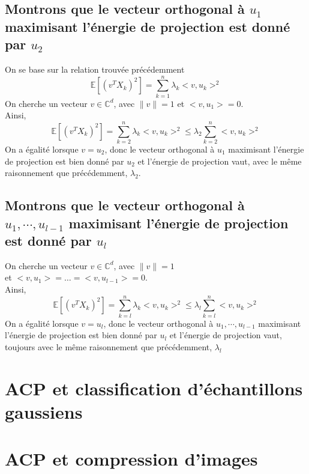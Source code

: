 \documentclass{report}
\begin{document}
		\subsection{Montrons que le vecteur orthogonal à $u_1$ maximisant l'énergie de projection est donné par $u_2$}
			On se base sur la relation trouvée précédemment
			\[ \mathbb{E}[(v^TX_k)^2] = \sum\limits_{k=1}^n \lambda_k<v, u_k>^2 \]
			On cherche un vecteur $v \in \mathbb{C}^d$, avec $\lVert v \rVert = 1$ et $<v, u_1> = 0$. \\
			Ainsi, 
			\[ \mathbb{E}[(v^TX_k)^2] = \sum\limits_{k=2}^n \lambda_k<v, u_k>^2 \leq \lambda_2\sum\limits_{k=2}^n <v, u_k>^2 \]
			On a égalité lorsque $v=u_2$, donc le vecteur orthogonal à $u_1$ maximisant l'énergie de projection est bien donné par $u_2$ et l'énergie de projection vaut, avec le même raisonnement que précédemment, $\lambda_2$.
		\subsection{Montrons que le vecteur orthogonal à $u_1, \cdots, u_{l-1}$ maximisant l'énergie de projection est donné par $u_l$}
			On cherche un vecteur $v \in \mathbb{C}^d$, avec $\lVert v \rVert = 1$ \\
			et $<v, u_1> = \ldots = <v, u_{l-1}> = 0$. \\
			Ainsi, 
			\[ \mathbb{E}[(v^TX_k)^2] = \sum\limits_{k=l}^n \lambda_k<v, u_k>^2 \leq \lambda_l\sum\limits_{k=l}^n <v, u_k>^2 \]
			On a égalité lorsque $v=u_l$, donc le vecteur orthogonal à $u_1, \cdots, u_{l-1}$ maximisant l'énergie de projection est bien donné par $u_l$ et l'énergie de projection vaut, toujours avec le même raisonnement que précédemment, $\lambda_l$

	\section{ACP et classification d'échantillons gaussiens}
	\section{ACP et compression d'images}
	
\end{document}
